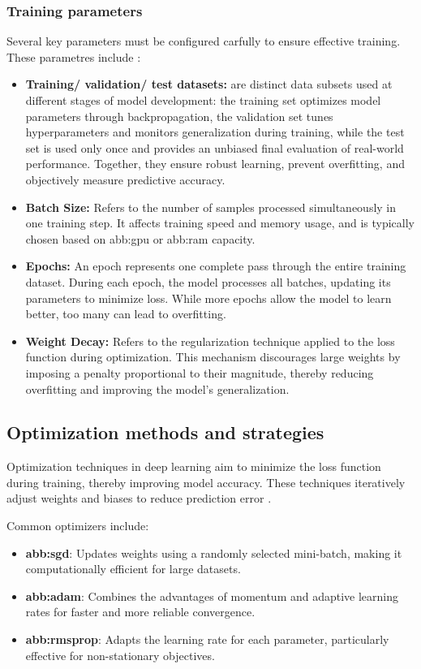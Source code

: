 \subsubsection{Training parameters}
Several key parameters must be configured carfully to ensure effective training. These parametres include \parencite{reis2024integrated}:
\begin{itemize}
    \item \textbf{Training/ validation/ test datasets:} are distinct data subsets used at different stages of model development: the training set optimizes model parameters through backpropagation, the validation set tunes hyperparameters and monitors generalization during training, while the test set is used only once and provides an unbiased final evaluation of real-world performance. Together, they ensure robust learning, prevent overfitting, and objectively measure predictive accuracy.

    \item \textbf{Batch Size:} Refers to the number of samples processed simultaneously in one training step. It affects training speed and memory usage, and is typically chosen based on \gls{abb:gpu} or \gls{abb:ram} capacity.

    \item \textbf{Epochs:} An epoch represents one complete pass through the entire training dataset. During each epoch, the model processes all batches, updating its parameters to minimize loss. While more epochs allow the model to learn better, too many can lead to overfitting.

    \item \textbf{Weight Decay:} Refers to the regularization technique applied to the loss function during optimization. This mechanism discourages large weights by imposing a penalty proportional to their magnitude, thereby reducing overfitting and improving the model's generalization.
\end{itemize}
\subsection{Optimization methods and strategies}

Optimization techniques in deep learning aim to minimize the loss function during training, thereby improving model accuracy. These techniques iteratively adjust weights and biases to reduce prediction error \parencite{alzubaidi2021review}.

Common optimizers include:
\begin{itemize}
    \item \textbf{\gls{abb:sgd}}: Updates weights using a randomly selected mini-batch, making it computationally efficient for large datasets.
    \item \textbf{\gls{abb:adam}}: Combines the advantages of momentum and adaptive learning rates for faster and more reliable convergence.
    \item \textbf{\gls{abb:rmsprop}}: Adapts the learning rate for each parameter, particularly effective for non-stationary objectives.
\end{itemize}


